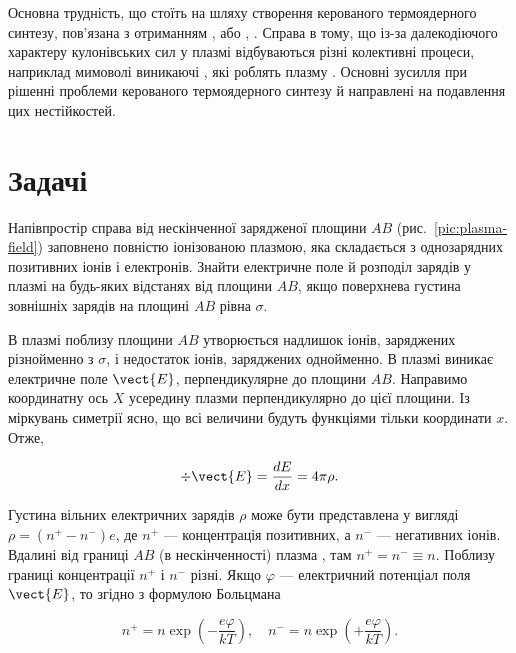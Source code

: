 Основна трудність, що стоїть на шляху створення керованого термоядерного синтезу, пов'язана з отриманням , або , . Справа в тому, що із-за далекодіючого характеру кулонівських сил у плазмі відбуваються різні колективні процеси, наприклад мимоволі виникаючі , які роблять плазму . Основні зусилля при рішенні проблеми керованого термоядерного синтезу й направлені на подавлення цих нестійкостей.

\section*{Задачі}
{}

\begin{problem}\label{prb:plasma-field}
	Напівпростір справа від нескінченної зарядженої площини $AB$ (рис.~\ref{pic:plasma-field}) заповнено повністю іонізованою плазмою, яка складається з однозарядних позитивних іонів і електронів. Знайти електричне поле й розподіл зарядів у плазмі на будь-яких відстанях від площини $AB$, якщо поверхнева густина зовнішніх зарядів на площині $AB$ рівна $\sigma$.
\end{problem}

 В плазмі поблизу площини $AB$ утворюється надлишок іонів, заряджених різнойменно з $\sigma$, і недостаток іонів, заряджених однойменно. В плазмі виникає електричне поле $\vect{E}$, перпендикулярне до площини $AB$. Направимо координатну ось $X$ усередину плазми перпендикулярно до цієї площини. Із міркувань симетрії ясно, що всі величини будуть функціями тільки координати $x$. Отже,

\begin{equation}\label{eq:poisson-1d}
	\div\vect{E} = \frac{dE}{dx} = 4\pi\rho.
\end{equation}

Густина вільних електричних зарядів $\rho$ може бути представлена у вигляді $\rho = (n^+ - n^-)e$, де $n^+$ --- концентрація позитивних, а $n^-$ --- негативних іонів. Вдалині від границі $AB$ (в нескінченності) плазма , там $n^+ = n^- \equiv n$. Поблизу границі концентрації $n^+$ і $n^-$ різні. Якщо $\varphi$ --- електричний потенціал поля $\vect{E}$, то згідно з формулою Больцмана

\begin{equation}\label{eq:boltzmann}
	n^+ = n\exp\left(-\frac{e\varphi}{kT}\right), \quad n^- = n\exp\left(+\frac{e\varphi}{kT}\right).
\end{equation}

